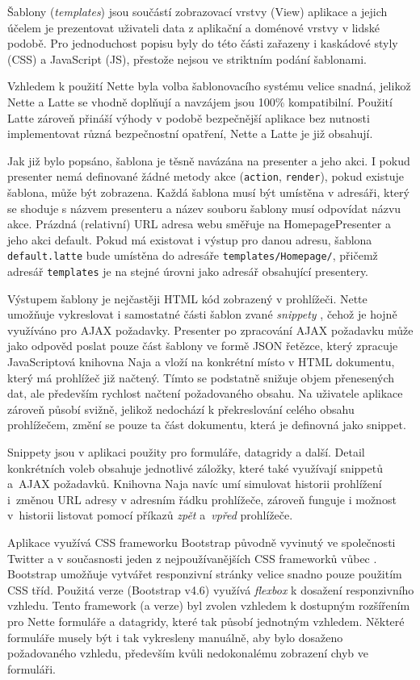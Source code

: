 Šablony (\textit{templates}) jsou součástí zobrazovací vrstvy (View) aplikace a jejich účelem je prezentovat uživateli data z aplikační a doménové vrstvy v lidské podobě. Pro jednoduchost popisu byly do této části zařazeny i kaskádové styly (CSS) a JavaScript (JS), přestože nejsou ve striktním podání šablonami.

Vzhledem k použití Nette byla volba šablonovacího systému velice snadná, jelikož Nette a Latte se vhodně doplňují a navzájem jsou 100\% kompatibilní. Použití Latte zároveň přináší výhody v podobě bezpečnější aplikace bez nutnosti implementovat různá bezpečnostní opatření, Nette a Latte je již obsahují.

Jak již bylo popsáno, šablona je těsně navázána na presenter a jeho akci. I pokud presenter nemá definované žádné metody akce (\texttt{action}, \texttt{render}), pokud existuje šablona, může být zobrazena. Každá šablona musí být umístěna v adresáři, který se shoduje s názvem presenteru a název souboru šablony musí odpovídat názvu akce. Prázdná (relativní) URL adresa webu směřuje na HomepagePresenter a jeho akci default. Pokud má existovat i výstup pro danou adresu, šablona \texttt{default.latte} bude umístěna do adresáře \texttt{templates/Homepage/}, přičemž adresář \texttt{templates} je na stejné úrovni jako adresář obsahující presentery.

Výstupem šablony je nejčastěji HTML kód zobrazený v prohlížeči. Nette umožňuje vykreslovat i samostatné části šablon zvané \textit{snippety} \cite{NetteDocs}, čehož je hojně využíváno pro AJAX požadavky. Presenter po zpracování AJAX požadavku může jako odpověd poslat pouze část šablony ve formě JSON řetězce, který zpracuje JavaScriptová knihovna Naja a vloží na konkrétní místo v HTML dokumentu, který má prohlížeč již načtený. Tímto se podstatně snižuje objem přenesených dat, ale především rychlost načtení požadovaného obsahu. Na uživatele aplikace zároveň působí svižně, jelikož nedochází k překreslování celého obsahu prohlížečem, změní se pouze ta část dokumentu, která je definovná jako snippet.

Snippety jsou v aplikaci použity pro formuláře, datagridy a další. Detail konkrétních voleb obsahuje jednotlivé záložky, které také využívají snippetů a~AJAX požadavků. Knihovna Naja navíc umí simulovat historii prohlížení i~změnou URL adresy v adresním řádku prohlížeče, zároveň funguje i možnost v~historii listovat pomocí příkazů \textit{zpět} a~\textit{vpřed} prohlížeče.

Aplikace využívá CSS frameworku Bootstrap původně vyvinutý ve společnosti Twitter a v současnosti jeden z nejpoužívanějších CSS frameworků vůbec \cite{Bootstrap}. Bootstrap umožňuje vytvářet responzivní stránky velice snadno pouze použitím CSS tříd. Použitá verze (Bootstrap v4.6) využívá \textit{flexbox} k dosažení responzivního vzhledu. Tento framework (a verze) byl zvolen vzhledem k dostupným rozšířením pro Nette formuláře a datagridy, které tak působí jednotným vzhledem. Některé formuláře musely být i tak vykresleny manuálně, aby bylo dosaženo požadovaného vzhledu, především kvůli nedokonalému zobrazení chyb ve formuláři.

